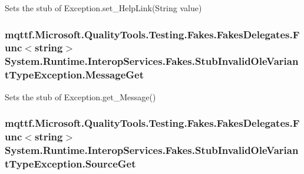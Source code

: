 Sets the stub of Exception.\-set\-\_\-\-Help\-Link(\-String value)

\hypertarget{class_system_1_1_runtime_1_1_interop_services_1_1_fakes_1_1_stub_invalid_ole_variant_type_exception_ae9717cfe5f842afaa59193f8f118d1e3}{
\subsubsection[{Message\-Get}]{\setlength{\rightskip}{0pt plus 5cm}mqttf.\-Microsoft.\-Quality\-Tools.\-Testing.\-Fakes.\-Fakes\-Delegates.\-Func$<$string$>$ System.\-Runtime.\-Interop\-Services.\-Fakes.\-Stub\-Invalid\-Ole\-Variant\-Type\-Exception.\-Message\-Get}}\label{class_system_1_1_runtime_1_1_interop_services_1_1_fakes_1_1_stub_invalid_ole_variant_type_exception_ae9717cfe5f842afaa59193f8f118d1e3}


Sets the stub of Exception.\-get\-\_\-\-Message()

\hypertarget{class_system_1_1_runtime_1_1_interop_services_1_1_fakes_1_1_stub_invalid_ole_variant_type_exception_af3720ead793d585b840a8f418064a6dc}{
\subsubsection[{Source\-Get}]{\setlength{\rightskip}{0pt plus 5cm}mqttf.\-Microsoft.\-Quality\-Tools.\-Testing.\-Fakes.\-Fakes\-Delegates.\-Func$<$string$>$ System.\-Runtime.\-Interop\-Services.\-Fakes.\-Stub\-Invalid\-Ole\-Variant\-Type\-Exception.\-Source\-Get}}\label{class_system_1_1_runtime_1_1_interop_services_1_1_fakes_1_1_stub_invalid_ole_variant_type_exception_af3720ead793d585b840a8f418064a6dc}


